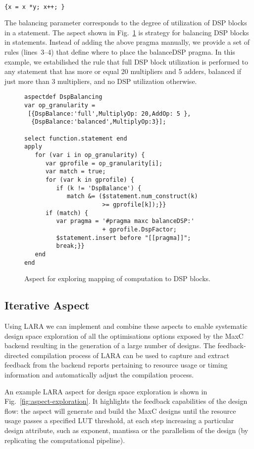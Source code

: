 \noindent\texttt{\footnotesize{} \\
\{x = x *y; x++; \}}

The balancing parameter corresponds to the degree of utilization of DSP blocks in a statement. 
The aspect shown in Fig.~\ref{fig:aspect-DSP} is strategy for balancing DSP blocks in statements. Instead
of adding the above pragma manually, we provide a set of rules (lines~3--4) that define where to place the balanceDSP pragma. In this example, we estabilished the rule that full DSP block utilization is performed to any statement that has more or equal 20 multipliers and 5 adders, balanced if just more than 3 multipliers, and no DSP utilization otherwise.

\lstset{style=lara}
\begin{figure}[!h]
  \centering
  \begin{lstlisting}
aspectdef DspBalancing
var op_granularity =
 [{DspBalance:'full',MultiplyOp: 20,AddOp: 5 },
  {DspBalance:'balanced',MultiplyOp:3}];

select function.statement end
apply
   for (var i in op_granularity) {
      var gprofile = op_granularity[i];
      var match = true;
      for (var k in gprofile) {
         if (k != 'DspBalance') {
            match &= ($statement.num_construct(k)
                      >= gprofile[k]);}}
      if (match) {
         var pragma = '#pragma maxc balanceDSP:'
                      + gprofile.DspFactor;
         $statement.insert before "[[pragma]]";
         break;}}
   end
end
  \end{lstlisting}
  \caption{Aspect for exploring mapping of computation to DSP blocks.}
  \label{fig:aspect-DSP}
\end{figure}

\subsection{Iterative Aspect}
\label{sect:asp_it}
Using LARA we can implement and combine these aspects to enable
systematic design space exploration of all the optimisations options
exposed by the MaxC backend resulting in the generation of a large
number of designs. The feedback-directed compilation process of LARA can
be used to capture and extract feedback from the backend reports
pertaining to resource usage or timing information and automatically
adjust the compilation process.

An example LARA aspect for design space exploration is
shown in Fig.~\ref{fig:aspect-exploration}. It highlights the feedback capabilities of the design
flow: the aspect will generate and build the MaxC designs until the
resource usage passes a specified LUT threshold, at each step
increasing a particular design attribute, such as exponent, mantissa or the parallelism of the design (by replicating the computational pipeline). 

